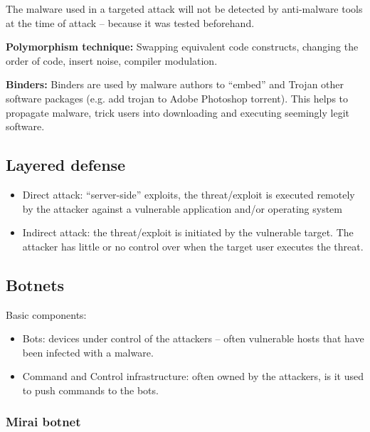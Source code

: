 \documentclass[11pt,oneside,a4paper]{article}
\begin{document}
The malware used in a targeted attack will not be detected by anti-malware tools at the time of attack – because it was tested beforehand.

\textbf{Polymorphism technique:} Swapping equivalent code constructs, changing the order of code, insert noise, compiler modulation.

\textbf{Binders:} Binders are used by malware authors to “embed” and Trojan other software packages (e.g. add trojan to Adobe Photoshop torrent). This helps to propagate malware, trick users into downloading and executing seemingly legit software. 

\subsection{Layered defense}

\vspace{-\topsep}
\begin{itemize}
	\setlength{\itemsep}{0pt}
	\setlength{\parskip}{0pt}
	\item Direct attack: “server-side” exploits, the threat/exploit is executed remotely by the attacker against a vulnerable application and/or operating system
	\item Indirect attack: the threat/exploit is initiated by the vulnerable target. The attacker has little or no control over when the target user executes the threat.
\end{itemize}
\vspace{-\topsep}

\subsection{Botnets}

Basic components:

\vspace{-\topsep}
\begin{itemize}
	\setlength{\itemsep}{0pt}
	\setlength{\parskip}{0pt}
	\item Bots: devices under control of the attackers – often vulnerable hosts that have been
	infected with a malware.
	\item Command and Control infrastructure: often owned by the attackers, is it used to push
	commands to the bots.
\end{itemize}
\vspace{-\topsep}

\subsubsection{Mirai botnet}
\label{mirai_botnet}
\end{document}
